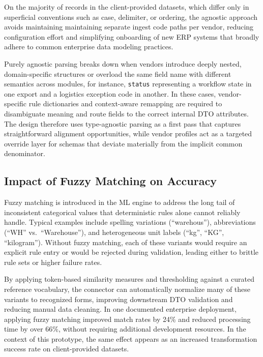 \documentclass{article}
\begin{document}
On the majority of records in the client-provided datasets, which differ only in superficial conventions such as case, delimiter, or ordering, the agnostic approach avoids maintaining maintaining separate ingest code paths per vendor, reducing configuration
effort and simplifying onboarding of new ERP systems that broadly adhere to common enterprise
data modeling practices.\autocite{skyvia2026patterns,nexla2024enterprise}

Purely agnostic parsing breaks down when vendors introduce deeply nested, domain-specific
structures or overload the same field name with different semantics across modules, for
instance, \texttt{status} representing a workflow state in one export and a logistics exception
code in another.\autocite{doan2012principles}
In these cases, vendor-specific rule dictionaries and context-aware remapping are required to
disambiguate meaning and route fields to the correct internal DTO attributes.
The design therefore uses type-agnostic parsing as a first pass that captures straightforward
alignment opportunities, while vendor profiles act as a targeted override layer for schemas
that deviate materially from the implicit common denominator.\autocite{tacnode2026patterns}

\subsection{Impact of Fuzzy Matching on Accuracy}
Fuzzy matching is introduced in the ML engine to address the long tail of inconsistent
categorical values that deterministic rules alone cannot reliably handle.
Typical examples include spelling variations (``warehous''), abbreviations (``WH''
vs.\ ``Warehouse''), and heterogeneous unit labels (``kg'', ``KG'',
``kilogram'').\autocite{cohen2003comparison,aerospike2026fuzzy}
Without fuzzy matching, each of these variants would require an explicit rule entry or would
be rejected during validation, leading either to brittle rule sets or higher failure rates.

By applying token-based similarity measures and thresholding against a curated reference
vocabulary, the connector can automatically normalize many of these variants to recognized
forms, improving downstream DTO validation and reducing manual data
cleaning.\autocite{rapidfuzz2020github,profisee2023fuzzy}
In one documented enterprise deployment, applying fuzzy matching improved match rates by 24\%
and reduced processing time by over 66\%, without requiring additional development
resources.\autocite{dataladder2021fuzzy}
In the context of this prototype, the same effect appears as an increased transformation
success rate on client-provided datasets.
\end{document}
